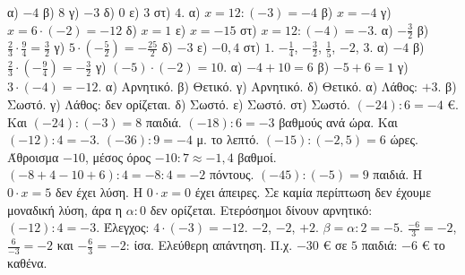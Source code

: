  α) $-4$ \quad β) $8$ \quad γ) $-3$ \quad δ) $0$ \quad ε) $3$ \quad στ) $4$.
 α) $x=12:(-3)=-4$ \quad β) $x=-4$ \quad γ) $x=6\cdot(-2)=-12$ \quad δ) $x=1$ \quad ε) $x=-15$ \quad στ) $x=12:(-4)=-3$.
 α) $-\frac{3}{2}$ \quad β) $\frac{2}{3}\cdot\frac{9}{4}=\frac{3}{2}$ \quad γ) $5\cdot\left(-\frac{5}{2}\right)=-\frac{25}{2}$ \quad δ) $-3$ \quad ε) $-0{,}4$ \quad στ) $1$.
 $-\frac{1}{4}$, $-\frac{3}{2}$, $\frac{1}{5}$, $-2$, $3$.
 α) $-4$ \quad β) $\frac{2}{3}\cdot\left(-\frac{9}{4}\right)=-\frac{3}{2}$ \quad γ) $(-5)\cdot(-2)=10$.
 α) $-4+10=6$ \quad β) $-5+6=1$ \quad γ) $3\cdot(-4)=-12$.
 α) Αρνητικό. β) Θετικό. γ) Αρνητικό. δ) Θετικό.
 α) Λάθος: $+3$. β) Σωστό. γ) Λάθος: δεν ορίζεται. δ) Σωστό. ε) Σωστό. στ) Σωστό.
 $(-24):6=-4$ €. Και $(-24):(-3)=8$ παιδιά.
 $(-18):6=-3$ βαθμούς ανά ώρα. Και $(-12):4=-3$.
 $(-36):9=-4$ μ. το λεπτό.
 $(-15):(-2{,}5)=6$ ώρες.
 Άθροισμα $-10$, μέσος όρος $-10:7\approx-1{,}4$ βαθμοί.
 $(-8+4-10+6):4=-8:4=-2$ πόντους.
 $(-45):(-5)=9$ παιδιά.
 Η $0\cdot x=5$ δεν έχει λύση. Η $0\cdot x=0$ έχει άπειρες. Σε καμία περίπτωση δεν έχουμε μοναδική λύση, άρα η $\alpha:0$ δεν ορίζεται.
 Ετερόσημοι δίνουν αρνητικό: $(-12):4=-3$. Έλεγχος: $4\cdot(-3)=-12$.
 $-2$, $-2$, $+2$.
 $\beta=\alpha:2=-5$.
 $\frac{-6}{3}=-2$, $\frac{6}{-3}=-2$ και $-\frac{6}{3}=-2$: ίσα.
 Ελεύθερη απάντηση. Π.χ. $-30$ € σε $5$ παιδιά: $-6$ € το καθένα.
